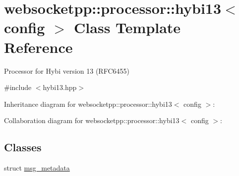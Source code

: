 \hypertarget{classwebsocketpp_1_1processor_1_1hybi13}{}\section{websocketpp\+:\+:processor\+:\+:hybi13$<$ config $>$ Class Template Reference}
\label{classwebsocketpp_1_1processor_1_1hybi13}


Processor for Hybi version 13 (R\+F\+C6455)  




{\ttfamily \#include $<$hybi13.\+hpp$>$}



Inheritance diagram for websocketpp\+:\+:processor\+:\+:hybi13$<$ config $>$\+:


Collaboration diagram for websocketpp\+:\+:processor\+:\+:hybi13$<$ config $>$\+:
\subsection*{Classes}
\begin{DoxyCompactItemize}
\item 
struct \mbox{\hyperlink{structwebsocketpp_1_1processor_1_1hybi13_1_1msg__metadata}{msg\+\_\+metadata}}
\end{DoxyCompactItemize}
